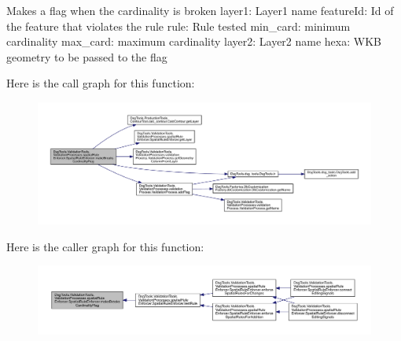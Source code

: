 \begin{DoxyVerb}Makes a flag when the cardinality is broken
layer1: Layer1 name
featureId: Id of the feature that violates the rule
rule: Rule tested
min_card: minimum cardinality
max_card: maximum cardinality
layer2: Layer2 name
hexa: WKB geometry to be passed to the flag
\end{DoxyVerb}
 Here is the call graph for this function\+:
\nopagebreak
\begin{figure}[H]
\begin{center}
\leavevmode
\includegraphics[width=350pt]{class_dsg_tools_1_1_validation_tools_1_1_validation_processes_1_1spatial_rule_enforcer_1_1_spatial_rule_enforcer_ae6529d8b4ac153e4bf0082d18b886560_cgraph}
\end{center}
\end{figure}
Here is the caller graph for this function\+:
\nopagebreak
\begin{figure}[H]
\begin{center}
\leavevmode
\includegraphics[width=350pt]{class_dsg_tools_1_1_validation_tools_1_1_validation_processes_1_1spatial_rule_enforcer_1_1_spatial_rule_enforcer_ae6529d8b4ac153e4bf0082d18b886560_icgraph}
\end{center}
\end{figure}
\mbox{\label{class_dsg_tools_1_1_validation_tools_1_1_validation_processes_1_1spatial_rule_enforcer_1_1_spatial_rule_enforcer_af5826fc69a3252c80d07579c23c14c32}} 
